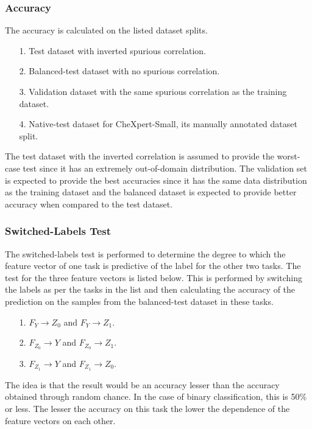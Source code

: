 \documentclass[12pt,DIV14,BCOR12mm,a4paper,footinclude=false,headinclude,parskip=half-,twoside,openright,cleardoublepage=empty,toc=index,bibliography=totoc,listof=totoc]{scrreprt}
\numberwithin{equation}{chapter}
\begin{document}
\subsubsection{Accuracy} 
The accuracy is calculated on the listed dataset splits. 

\begin{itemize}
    \item[1.] Test dataset with inverted spurious correlation.
    \item[2.] Balanced-test dataset with no spurious correlation.
    \item[3.] Validation dataset with the same spurious correlation as the training dataset.
    \item[4.] Native-test dataset for CheXpert-Small, its manually annotated dataset split.
\end{itemize}

The test dataset with the inverted correlation is assumed to provide the worst-case test since it has an extremely out-of-domain distribution. The validation set is expected to provide the best accuracies since it has the same data distribution as the training dataset and the balanced dataset is expected to provide better accuracy when compared to the test dataset.

\subsubsection{Switched-Labels Test}
The switched-labels test is performed to determine the degree to which the feature vector of one task is predictive of the label for the other two tasks. The test for the three feature vectors is listed below. This is performed by switching the labels as per the tasks in the list and then calculating the accuracy of the prediction on the samples from the balanced-test dataset in these tasks.   

\begin{itemize}
    \item [1.] $F_Y \rightarrow Z_0$  and $F_Y \rightarrow Z_1$.
    \item [2.] $F_{Z_0} \rightarrow Y$  and $F_{Z_0} \rightarrow Z_1$.
    \item [3.] $F_{Z_1} \rightarrow Y$  and $F_{Z_1} \rightarrow Z_0$.    
\end{itemize} 

The idea is that the result would be an accuracy lesser than the accuracy obtained through random chance. In the case of binary classification, this is 50\% or less. The lesser the accuracy on this task the lower the dependence of the feature vectors on each other.
\end{document}

